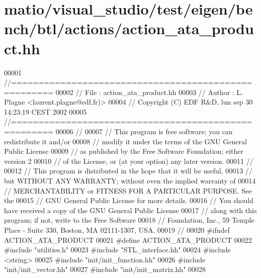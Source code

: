 \hypertarget{matio_2visual__studio_2test_2eigen_2bench_2btl_2actions_2action__ata__product_8hh_source}{}\section{matio/visual\+\_\+studio/test/eigen/bench/btl/actions/action\+\_\+ata\+\_\+product.hh}
\label{matio_2visual__studio_2test_2eigen_2bench_2btl_2actions_2action__ata__product_8hh_source}

\begin{DoxyCode}
00001 \textcolor{comment}{//=====================================================}
00002 \textcolor{comment}{// File   :  action\_ata\_product.hh}
00003 \textcolor{comment}{// Author :  L. Plagne <laurent.plagne@edf.fr)>}
00004 \textcolor{comment}{// Copyright (C) EDF R&D,  lun sep 30 14:23:19 CEST 2002}
00005 \textcolor{comment}{//=====================================================}
00006 \textcolor{comment}{//}
00007 \textcolor{comment}{// This program is free software; you can redistribute it and/or}
00008 \textcolor{comment}{// modify it under the terms of the GNU General Public License}
00009 \textcolor{comment}{// as published by the Free Software Foundation; either version 2}
00010 \textcolor{comment}{// of the License, or (at your option) any later version.}
00011 \textcolor{comment}{//}
00012 \textcolor{comment}{// This program is distributed in the hope that it will be useful,}
00013 \textcolor{comment}{// but WITHOUT ANY WARRANTY; without even the implied warranty of}
00014 \textcolor{comment}{// MERCHANTABILITY or FITNESS FOR A PARTICULAR PURPOSE.  See the}
00015 \textcolor{comment}{// GNU General Public License for more details.}
00016 \textcolor{comment}{// You should have received a copy of the GNU General Public License}
00017 \textcolor{comment}{// along with this program; if not, write to the Free Software}
00018 \textcolor{comment}{// Foundation, Inc., 59 Temple Place - Suite 330, Boston, MA  02111-1307, USA.}
00019 \textcolor{comment}{//}
00020 \textcolor{preprocessor}{#ifndef ACTION\_ATA\_PRODUCT}
00021 \textcolor{preprocessor}{#define ACTION\_ATA\_PRODUCT}
00022 \textcolor{preprocessor}{#include "utilities.h"}
00023 \textcolor{preprocessor}{#include "STL\_interface.hh"}
00024 \textcolor{preprocessor}{#include <string>}
00025 \textcolor{preprocessor}{#include "init/init\_function.hh"}
00026 \textcolor{preprocessor}{#include "init/init\_vector.hh"}
00027 \textcolor{preprocessor}{#include "init/init\_matrix.hh"}
00028 

\end{DoxyCode}
